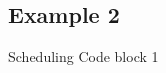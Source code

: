 \documentclass[notes xcolor=dvipsnames]{beamer}
\begin{document}
    \subsection{Example 2}
    \begin{frame}{Scheduling Code block 1}

        \begin{columns}
            
            \begin{column}{0.5\textwidth}
                \begin{figure}
                \end{figure}
                
            \end{column}

            \begin{column}{0.5\textwidth}

                \begin{figure}
                \end{figure}

                \begin{figure}
                \end{figure}
                
            \end{column}


        \end{columns}
        
        

    \end{frame}
\end{document}
